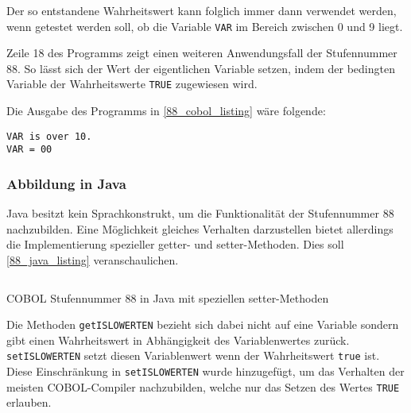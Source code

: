 Der so entstandene Wahrheitswert kann folglich immer dann verwendet werden, wenn getestet werden soll, ob die Variable \texttt{VAR} im Bereich zwischen 0 und 9 liegt.

Zeile 18 des Programms zeigt einen weiteren Anwendungsfall der Stufennummer 88. So lässt sich der Wert der eigentlichen Variable setzen, indem der bedingten Variable der Wahrheitswerte \texttt{TRUE} zugewiesen wird.

Die Ausgabe des Programms in \autoref{88_cobol_listing} wäre folgende:
\begin{verbatim}
VAR is over 10.
VAR = 00
\end{verbatim}

\subsubsection*{Abbildung in Java}
Java besitzt kein Sprachkonstrukt, um die Funktionalität der Stufennummer 88 nachzubilden. Eine Möglichkeit gleiches Verhalten darzustellen bietet allerdings die Implementierung spezieller getter- und setter-Methoden. Dies soll \autoref{88_java_listing} veranschaulichen.

\begin{listing}[H]
  \inputminted[bgcolor=mintedgrey,xleftmargin=20pt,linenos,fontsize=\footnotesize]{java}{code/88_section.java.txt}
  \caption{COBOL Stufennummer 88 in Java mit speziellen setter-Methoden}
  \label{88_java_listing}
\end{listing} 

Die Methoden \texttt{getISLOWERTEN} bezieht sich dabei nicht auf eine Variable sondern gibt einen Wahrheitswert in Abhängigkeit des Variablenwertes zurück. \texttt{setISLOWERTEN} setzt diesen Variablenwert wenn der Wahrheitswert \texttt{true} ist. Diese Einschränkung in \texttt{setISLOWERTEN} wurde hinzugefügt, um das Verhalten der meisten COBOL-Compiler nachzubilden, welche nur das Setzen des Wertes \texttt{TRUE} erlauben.